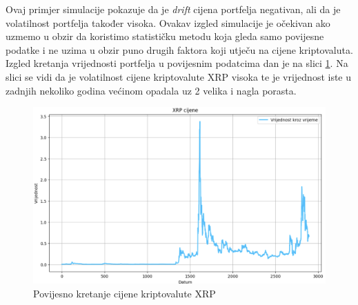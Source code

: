 \documentclass[zavrsnirad]{fer}
\begin{document}
Ovaj primjer simulacije pokazuje da je \textit{drift} cijena portfelja
negativan, ali da je volatilnost portfelja također visoka. Ovakav
izgled simulacije je očekivan ako uzmemo u obzir da koristimo
statističku metodu koja gleda samo povijesne podatke i ne uzima u obzir
puno drugih faktora koji utječu na cijene kriptovaluta. Izgled kretanja
vrijednosti portfelja u povijesnim podatcima dan je na slici \ref{fig:XRP_hist}.
Na slici se vidi da je volatilnost cijene kriptovalute XRP
visoka te je vrijednost iste u zadnjih nekoliko godina
većinom opadala uz 2 velika i nagla porasta.
\begin{figure}[H]
    \centering
    \includegraphics[width=1.0\textwidth]{Figures/XRP_hist.png}
    \caption{Povijesno kretanje cijene kriptovalute XRP}
    \label{fig:XRP_hist}
\end{figure}
\end{document}
